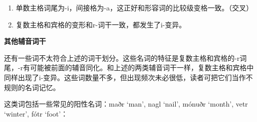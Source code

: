 \begin{enumerate}
  \def\labelenumi{\arabic{enumi})}
  \item
        单数主格词尾为-i，间接格为-a，这正好和形容词的比较级变格一致。（交叉）
  \item
        复数主格和宾格的变形和r-词干一致，都发生了i-变异。
\end{enumerate}

\textbf{其他辅音词干}

还有一些词不太符合上述的词干划分。这些名词的特征是复数主格和宾格的-r词尾，-r有可能被前面的辅音同化。和上述的两类辅音词干一样，复数主格和宾格中同样出现了i-变异。这些词数量不多，但出现频次未必很低，读者可把它们当作不规则的名词记忆。

这类词包括一些常见的阳性名词：maðr `man', nagl `nail', mónuðr `month',
vetr `winter', fótr `foot'：

